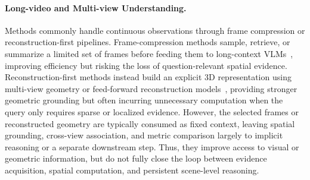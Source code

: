 \paragraph{Long-video and Multi-view Understanding.}
Methods commonly handle continuous observations through frame compression or reconstruction-first pipelines. 
Frame-compression methods sample, retrieve, or summarize a limited set of frames before feeding them to long-context VLMs~\citep{videollama,longva,tstar}, improving efficiency but risking the loss of question-relevant spatial evidence. 
Reconstruction-first methods instead build an explicit 3D representation using multi-view geometry or feed-forward reconstruction models~\citep{vggt,da3}, providing stronger geometric grounding but often incurring unnecessary computation when the query only requires sparse or localized evidence. 
However, the selected frames or reconstructed geometry are typically consumed as fixed context, leaving spatial grounding, cross-view association, and metric comparison largely to implicit reasoning or a separate downstream step. 
Thus, they improve access to visual or geometric information, but do not fully close the loop between evidence acquisition, spatial computation, and persistent scene-level reasoning.






